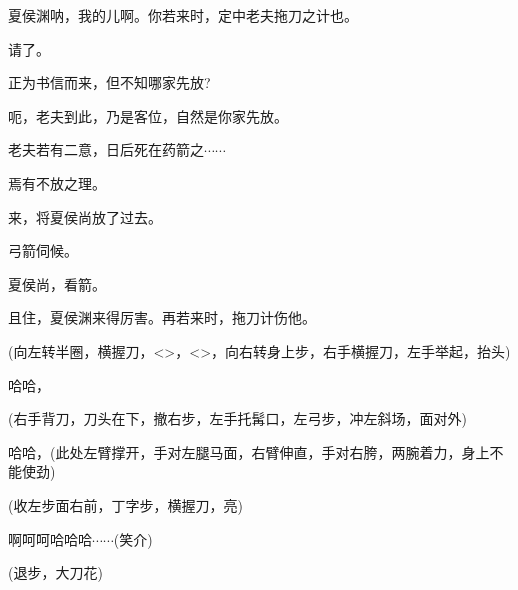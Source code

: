 {夏侯渊呐，我的儿啊。你若来时，定中老夫拖刀之计也。



\vspace{5pt}

请了。

正为书信而来，但不知哪家先放?

呃，老夫到此，乃是客位，自然是你家先放。

老夫若有二意，日后死在药箭之$\cdots{}\cdots{}$

焉有不放之理。

来，将夏侯尚放了过去。

弓箭伺候。

夏侯尚，看箭。

\vspace{5pt}

且住，夏侯渊来得厉害。再若来时，拖刀计伤他。

({\hwfs 向左转半圈}，{\hwfs 横握刀}，\textless{}\!\textgreater{}，\textless{}\!\textgreater{}，{\hwfs 向右转身上步}，{\hwfs 右手横握刀}，{\hwfs 左手举起}，{\hwfs 抬头})

哈哈，

({\hwfs 右手背刀}，{\hwfs 刀头在下}，{\hwfs 撤右步}，{\hwfs 左手托髯口}，{\hwfs 左弓步}，{\hwfs 冲左斜场}，{\hwfs 面对外})

哈哈，({\hwfs 此处左臂撑开}，{\hwfs 手对左腿马面}，{\hwfs 右臂伸直}，{\hwfs 手对右胯}，{\hwfs 两腕着力}，{\hwfs 身上不能使劲})

({\hwfs 收左步面右前}，{\hwfs 丁字步}，{\hwfs 横握刀}，{\hwfs 亮})

啊呵呵哈哈哈$\cdots{}\cdots{}$({\hwfs 笑介})

({\hwfs 退步}，{\hwfs 大刀花})

}
